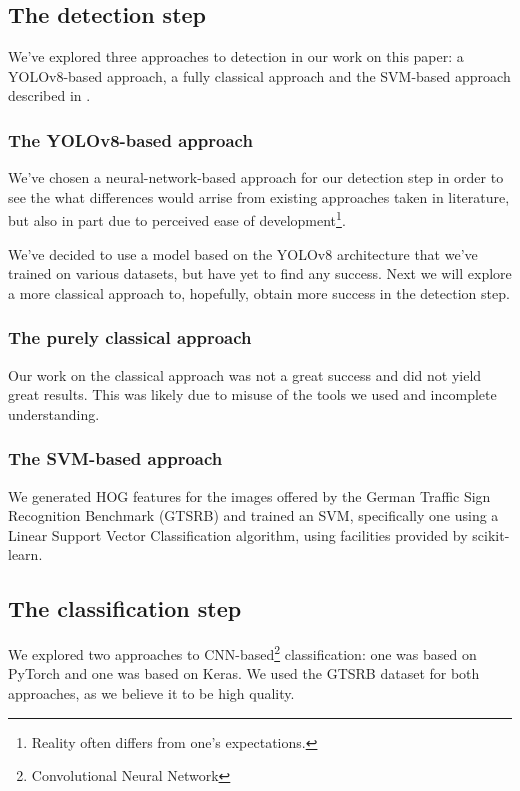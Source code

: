 \documentclass[conference]{IEEEtran}
\begin{document}
\subsection{The detection step}

We've explored three approaches to detection in our work on this paper: a YOLOv8-based approach,
a fully classical approach and the SVM-based approach described in \cite{svm_paper}.

\subsubsection*{The YOLOv8-based approach}
We've chosen a neural-network-based approach for our detection step in order to see the
what differences would arrise from existing approaches taken in literature, but also in
part due to perceived ease of development\footnote{Reality often differs from one's
expectations.}.

We've decided to use a model based on the YOLOv8 architecture that we've trained on various
datasets, but have yet to find any success. Next we will explore a more classical approach
to, hopefully, obtain more success in the detection step.


\subsubsection*{The purely classical approach}
Our work on the classical approach was not a great success and did not yield great results.
This was likely due to misuse of the tools we used and incomplete understanding.

\subsubsection*{The SVM-based approach}
We generated HOG features for the images offered by the German Traffic Sign Recognition
Benchmark (GTSRB)\cite{Houben-IJCNN-2013} and trained an SVM, specifically one using a Linear
Support Vector Classification algorithm, using facilities provided by scikit-learn\cite{scikit-learn}.

\subsection{The classification step}

We explored two approaches to CNN-based\footnote{Convolutional Neural Network} classification: one was based on PyTorch\cite{Paszke_PyTorch_An_Imperative_2019}
and one was based on Keras\cite{chollet2015keras}. We used the GTSRB dataset for both approaches,
as we believe it to be high quality.
\end{document}
